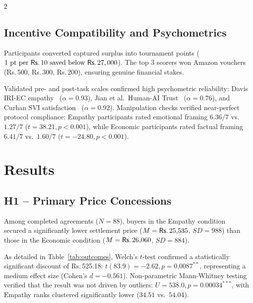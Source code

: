 \documentclass[10pt,a4paper]{article}
\newcommand{\rs}{\textsf{Rs.\,}}
\begin{document}
\begin{multicols}{2}
\subsection{Incentive Compatibility and Psychometrics}

Participants converted captured surplus into tournament points ($1\text{ pt per }\rs10\text{ saved below }\rs27,000$). The top 3 scorers won Amazon vouchers (\rs500, \rs300, \rs200), ensuring genuine financial stakes.

Validated pre- and post-task scales confirmed high psychometric reliability: Davis IRI-EC empathy~\cite{davis1983} ($\alpha = 0.93$), Jian et al.\ Human-AI Trust~\cite{jian2000} ($\alpha = 0.76$), and Curhan SVI satisfaction~\cite{curhan2006} ($\alpha = 0.92$). Manipulation checks verified near-perfect protocol compliance: Empathy participants rated emotional framing $6.36/7$ vs.\ $1.27/7$ ($t = 38.21, p < 0.001$), while Economic participants rated factual framing $6.41/7$ vs.\ $1.60/7$ ($t = -24.80, p < 0.001$).

\section{Results}

\subsection{H1 -- Primary Price Concessions}

Among completed agreements ($N = 88$), buyers in the Empathy condition secured a significantly lower settlement price ($M = \text{\rs}25{,}535$, $SD = 988$) than those in the Economic condition ($M = \text{\rs}26{,}060$, $SD = 884$).

As detailed in Table~\ref{tab:outcomes}, Welch's $t$-test confirmed a statistically significant discount of \rs525.18: $t(83.9) = -2.62, p = 0.0087^{**}$, representing a medium effect size (Cohen's $d = -0.561$). Non-parametric Mann-Whitney testing verified that the result was not driven by outliers: $U = 538.0, p = 0.00034^{***}$, with Empathy ranks clustered significantly lower ($34.51$ vs.\ $54.04$).


\end{multicols}
\end{document}

